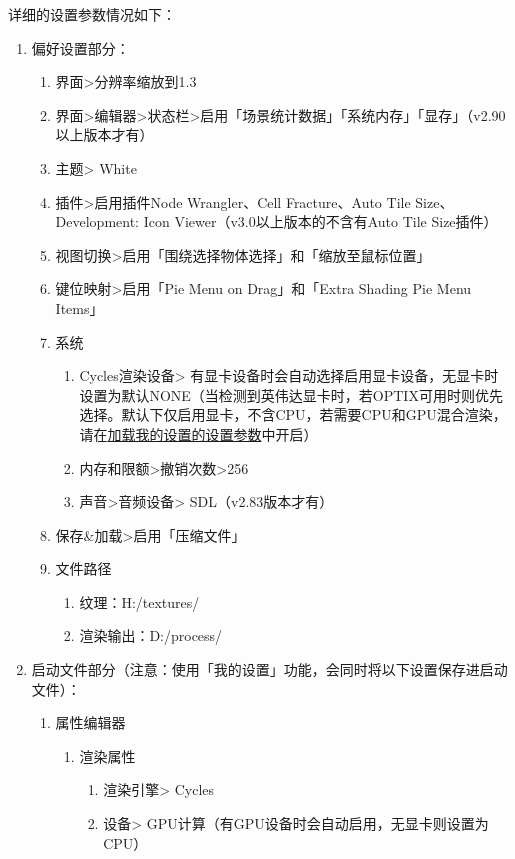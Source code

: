 \documentclass{../../public_resources/doc}
\begin{document}
\noindent 详细的设置参数情况如下：
\begin{enumerate}
    \item 偏好设置部分：
    \begin{enumerate}
        \item 界面>分辨率缩放到1.3
        \item 界面>编辑器>状态栏>启用「场景统计数据」「系统内存」「显存」（v2.90以上版本才有）
        \item 主题> White
        \item 插件>启用插件Node Wrangler、Cell Fracture、Auto Tile Size、Development: Icon Viewer（v3.0以上版本的不含有Auto Tile Size插件）
        \item 视图切换>启用「围绕选择物体选择」和「缩放至鼠标位置」
        \item 键位映射>启用「Pie Menu on Drag」和「Extra Shading Pie Menu Items」
        \item 系统
        \begin{enumerate}
            \item Cycles渲染设备> 有显卡设备时会自动选择启用显卡设备，无显卡时设置为默认NONE（当检测到英伟达显卡时，若OPTIX可用时则优先选择。默认下仅启用显卡，不含CPU，若需要CPU和GPU混合渲染，请在\hyperlink{加载我的设置小节}{加载我的设置的设置参数}中开启）
            \item 内存和限额>撤销次数>256
            \item 声音>音频设备> SDL（v2.83版本才有）
        \end{enumerate}
        \item 保存\&加载>启用「压缩文件」
        \item 文件路径
        \begin{enumerate}
            \item 纹理：H:/textures/
            \item 渲染输出：D:/process/
        \end{enumerate}
    \end{enumerate}
    \item 启动文件部分（注意：使用「我的设置」功能，会同时将以下设置保存进启动文件）：
    \begin{enumerate}
        \item 属性编辑器
        \begin{enumerate}
            \item 渲染属性
            \begin{enumerate}
                \item 渲染引擎> Cycles
                \item 设备> GPU计算（有GPU设备时会自动启用，无显卡则设置为CPU）

\end{enumerate}
\end{enumerate}
\end{enumerate}
\end{enumerate}
\end{document}
